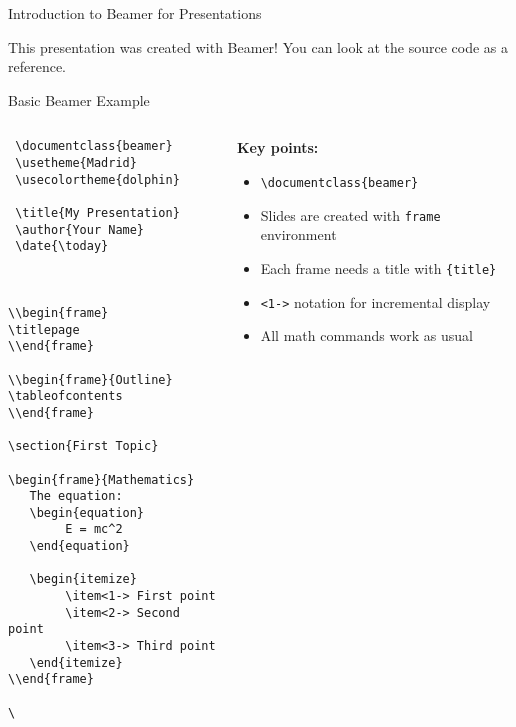 \begin{frame}{Introduction to Beamer for Presentations}
          \begin{tip}
               This presentation was created with Beamer! You can look at the source code as a reference.
          \end{tip}
     \end{frame}
     
     \begin{frame}[fragile]{Basic Beamer Example}
          \begin{columns}
               \begin{column}{0.5\textwidth}
                    \begin{lstlisting}
 \documentclass{beamer}
 \usetheme{Madrid}
 \usecolortheme{dolphin}
 
 \title{My Presentation}
 \author{Your Name}
 \date{\today}
 
 
      
\\begin{frame}
\titlepage
\\end{frame}

\\begin{frame}{Outline}
\tableofcontents
\\end{frame}

\section{First Topic}

\begin{frame}{Mathematics}
   The equation:
   \begin{equation}
        E = mc^2
   \end{equation}
   
   \begin{itemize}
        \item<1-> First point
        \item<2-> Second point
        \item<3-> Third point
   \end{itemize}
\\end{frame}
   
\
              \end{lstlisting}
         \end{column}
         
         \begin{column}{0.5\textwidth}
              \textbf{Key points:}
              \begin{itemize}
                   \item \texttt{\textbackslash documentclass\{beamer\}}
                   \item Slides are created with \texttt{frame} environment
                   \item Each frame needs a title with \texttt{\{title\}}
                   \item \texttt{<1->} notation for incremental display
                   \item All math commands work as usual
              \end{itemize}
              

\end{column}
\end{columns}
\end{frame}
